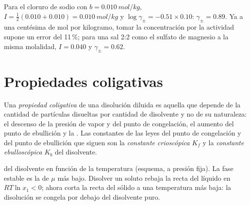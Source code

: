 \begin{example}\label{ex:b2:chemical-potential:dh}
Para el cloruro de sodio con $b = \qty{0.010}{mol/kg}$, $I = \frac12(0.010 + 0.010)
= \qty{0.010}{mol/kg}$ y $\log\gamma_\pm = -0.51 \times 0.10$: $\gamma_\pm
= 0.89$. Ya a una centésima de mol por kilogramo, tomar la
concentración por la actividad supone un error del 11\,\%; para una sal 2:2 como
el sulfato de magnesio a la misma molalidad, $I = 0.040$ y $\gamma_\pm = 0.62$.
\end{example}

\section{Propiedades coligativas}

\begin{definition}\label{def:b2:chemical-potential:colligative}
Una \emph{propiedad coligativa} de una disolución
diluida es aquella que depende de la cantidad de partículas disueltas por
cantidad de disolvente y no de su naturaleza: el descenso de la presión de
vapor y del punto de congelación, el aumento del punto de ebullición y la
. Las constantes de las leyes del punto de congelación y del punto de ebullición
que siguen son la \emph{constante crioscópica} $K_f$
y la \emph{constante ebulloscópica} $K_b$ del
disolvente.
\end{definition}

\begin{omfigure}

{\small {} del disolvente en función de la temperatura (esquema,
a presión fija). La fase estable es la de $\mu$ más bajo. Disolver un
soluto rebaja la recta del líquido en $RT\ln x_1 < 0$; ahora corta la recta del sólido
a una temperatura más baja: la disolución se congela por debajo del disolvente puro.}
\end{omfigure}


